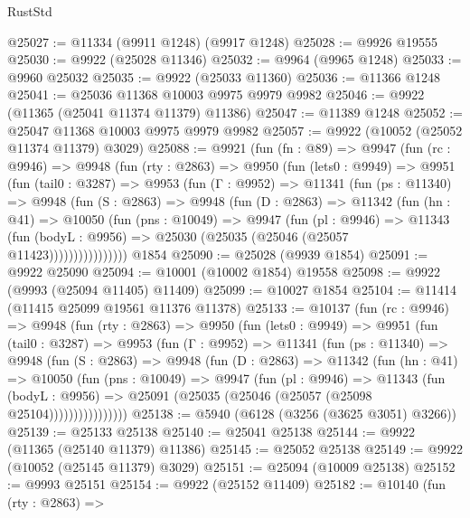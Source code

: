 \begin{lexlean}{RustStd}
\begin{coremodule}
@25027 := @11334 (@9911 @1248) (@9917 @1248)
@25028 := @9926 @19555
@25030 := @9922 (@25028 @11346)
@25032 := @9964 (@9965 @1248)
@25033 := @9960 @25032
@25035 := @9922 (@25033 @11360)
@25036 := @11366 @1248
@25041 := @25036 @11368 @10003 @9975 @9979 @9982
@25046 := @9922 (@11365 (@25041 @11374 @11379) @11386)
@25047 := @11389 @1248
@25052 := @25047 @11368 @10003 @9975 @9979 @9982
@25057 := @9922 (@10052 (@25052 @11374 @11379) @3029)
@25088 := @9921
    (fun (fn : @89) =>
    @9947
      (fun (rc : @9946) =>
      @9948
        (fun (rty : @2863) =>
        @9950
          (fun (lets0 : @9949) =>
          @9951
            (fun (tail0 : @3287) =>
            @9953
              (fun (Γ : @9952) =>
              @11341
                (fun (ps : @11340) =>
                @9948
                  (fun (S : @2863) =>
                  @9948
                    (fun (D : @2863) =>
                    @11342
                      (fun (hn : @41) =>
                      @10050
                        (fun (pns : @10049) =>
                        @9947
                          (fun (pl : @9946) =>
                          @11343
                            (fun (bodyL : @9956) =>
                            @25030 (@25035 (@25046 (@25057 @11423))))))))))))))))
    @1854
@25090 := @25028 (@9939 @1854)
@25091 := @9922 @25090
@25094 := @10001 (@10002 @1854) @19558
@25098 := @9922 (@9993 (@25094 @11405) @11409)
@25099 := @10027 @1854
@25104 := @11414 (@11415 @25099 @19561 @11376 @11378)
@25133 := @10137
    (fun (rc : @9946) =>
    @9948
      (fun (rty : @2863) =>
      @9950
        (fun (lets0 : @9949) =>
        @9951
          (fun (tail0 : @3287) =>
          @9953
            (fun (Γ : @9952) =>
            @11341
              (fun (ps : @11340) =>
              @9948
                (fun (S : @2863) =>
                @9948
                  (fun (D : @2863) =>
                  @11342
                    (fun (hn : @41) =>
                    @10050
                      (fun (pns : @10049) =>
                      @9947
                        (fun (pl : @9946) =>
                        @11343
                          (fun (bodyL : @9956) =>
                          @25091 (@25035 (@25046 (@25057 (@25098 @25104))))))))))))))))
@25138 := @5940 (@6128 (@3256 (@3625 @3051) @3266))
@25139 := @25133 @25138
@25140 := @25041 @25138
@25144 := @9922 (@11365 (@25140 @11379) @11386)
@25145 := @25052 @25138
@25149 := @9922 (@10052 (@25145 @11379) @3029)
@25151 := @25094 (@10009 @25138)
@25152 := @9993 @25151
@25154 := @9922 (@25152 @11409)
@25182 := @10140
    (fun (rty : @2863) =>

\end{coremodule}
\end{lexlean}
